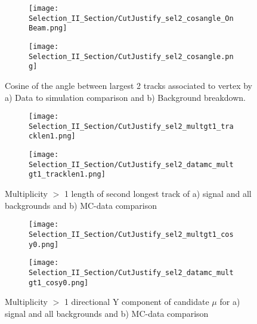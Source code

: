 \begin{figure}[t!]
\centering
  \begin{subfigure}[t]{0.4\textwidth}
    \centering
\texttt{[image: Selection\_II\_Section/CutJustify\_sel2\_cosangle\_OnBeam.png]}
  \caption{ }
  \end{subfigure} 
  \hspace{20mm}
  \begin{subfigure}[t]{0.4\textwidth}
    \centering
\texttt{[image: Selection\_II\_Section/CutJustify\_sel2\_cosangle.png]}
  \caption{ }
  \end{subfigure} 
\caption{Cosine of the angle between largest 2 tracks associated to vertex by a) Data to simulation comparison and b) Background breakdown. }
\label{fig:cutjust_sel2_cosangle}
\end{figure}

\begin{figure}[t!]
\centering
 \begin{subfigure}[t]{0.4\textwidth}
    \centering
\texttt{[image: Selection\_II\_Section/CutJustify\_sel2\_multgt1\_tracklen1.png]}
 \caption{ }
  \end{subfigure} 
  \hspace{20mm}
  \begin{subfigure}[t]{0.4\textwidth}
    \centering
\texttt{[image: Selection\_II\_Section/CutJustify\_sel2\_datamc\_multgt1\_tracklen1.png]}
 \caption{ }
  \end{subfigure} 
\caption{Multiplicity $>$ 1 length of second longest track of a) signal and all backgrounds and b) MC-data comparison }
\label{fig:cutjust_sel2_multgt1_tracklen1}
\end{figure}

\begin{figure}[t!]
\centering
  \begin{subfigure}[t]{0.4\textwidth}
    \centering
\texttt{[image: Selection\_II\_Section/CutJustify\_sel2\_multgt1\_cosy0.png]}
 \caption{ }
  \end{subfigure} 
  \hspace{20mm}
  \begin{subfigure}[t]{0.4\textwidth}
    \centering
\texttt{[image: Selection\_II\_Section/CutJustify\_sel2\_datamc\_multgt1\_cosy0.png]}
 \caption{ }
  \end{subfigure} 
\caption{Multiplicity $>$ 1 directional Y component of candidate $\mu$ for a) signal and all backgrounds and b) MC-data comparison }
\label{fig:cutjust_sel2_multgt1_dcosy}
\end{figure}

